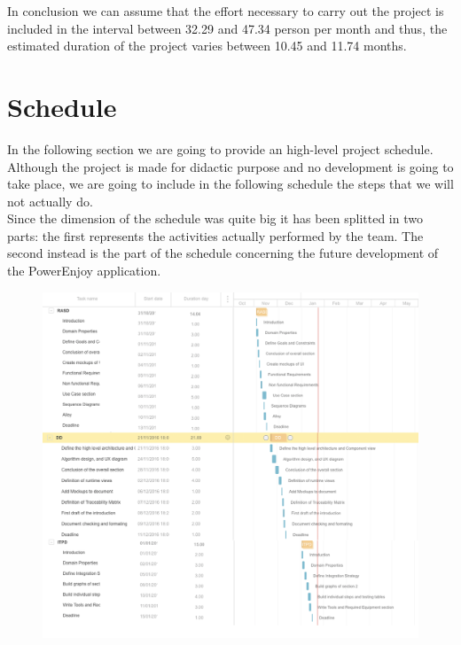 \documentclass[a4paper,10pt]{article}
\begin{document}
  In conclusion we can assume that the effort necessary to carry out the project is included in the interval between 32.29 and 47.34 person 
  per month and thus, the estimated duration of the project varies between 10.45 and 11.74 months.
  \clearpage\section{Schedule} In the following section we are going to provide an high-level project schedule.\\ Although the project is
  made for didactic purpose and no development is going to take place, we are going to include in the following schedule
  the steps that we will not actually do.\\ Since the dimension of the schedule was quite big it has been splitted in two parts: the first 
  represents the activities actually performed by the team. The second instead is the part of the schedule concerning the future development 
  of the PowerEnjoy application.\\\bigskip
            \begin{figure}[!h]
  \centering
    \includegraphics[scale=0.50]{Resources/gant1.png}
  \end{figure}\FloatBarrier
\end{document}
